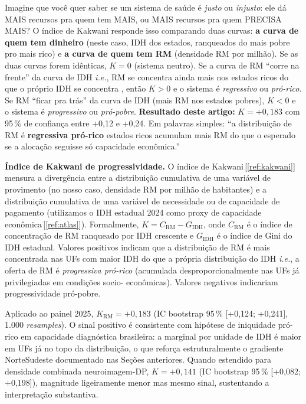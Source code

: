 \documentclass[12pt,a4paper,oneside]{article}
\begin{document}
\begin{tcolorbox}[colback=blue!4,colframe=blue!50!black,
                  sharp corners,boxrule=0.4pt,
                  title=\textbf{Em linguagem simples: o que é o
                  índice de Kakwani?},fonttitle=\small\bfseries]
\small
Imagine que você quer saber se um sistema de saúde é \textit{justo}
ou \textit{injusto}: ele dá MAIS recursos pra quem tem MAIS, ou
MAIS recursos pra quem PRECISA MAIS? O índice de Kakwani responde
isso comparando duas curvas: \textbf{a curva de quem tem dinheiro}
(neste caso, IDH dos estados, ranqueados do mais pobre pro mais
rico) e \textbf{a curva de quem tem RM} (densidade RM por milhão).
Se as duas curvas forem idênticas, $K = 0$ (sistema neutro). Se a
curva de RM ``corre na frente'' da curva de IDH \textemdash{}
\textit{i.e.}, RM se concentra ainda mais nos estados ricos do que
o próprio IDH se concentra \textemdash{}, então $K > 0$ e o sistema
é \textit{regressivo} ou \textit{pró-rico}. Se RM ``ficar pra
trás'' da curva de IDH (mais RM nos estados pobres), $K < 0$ e o
sistema é \textit{progressivo} ou \textit{pró-pobre}.
\textbf{Resultado deste artigo:} $K = +0{,}183$ com 95\,\% de
confiança entre +0,12 e +0,24. Em palavras simples: ``a
distribuição de RM é \textbf{regressiva pró-rico} \textemdash{}
estados ricos acumulam mais RM do que o esperado se a alocação
seguisse só capacidade econômica.''
\end{tcolorbox}

\textbf{Índice de Kakwani de progressividade.} O índice de
Kakwani\,[\ref{ref:kakwani}] mensura a divergência entre a
distribuição cumulativa de uma variável de provimento (no nosso
caso, densidade RM por milhão de habitantes) e a distribuição
cumulativa de uma variável de necessidade ou de capacidade de
pagamento (utilizamos o IDH estadual 2024 como proxy de capacidade
econômica\,[\ref{ref:atlas}]). Formalmente, $K = C_{\text{RM}} -
G_{\text{IDH}}$, onde $C_{\text{RM}}$ é o índice de concentração
de RM ranqueado por IDH crescente e $G_{\text{IDH}}$ é o índice
de Gini do IDH estadual. Valores positivos indicam que a
distribuição de RM é mais concentrada nas UFs com maior IDH do
que a própria distribuição do IDH \textemdash{} \textit{i.e.}, a
oferta de RM é \textit{progressiva pró-rico} (acumulada
desproporcionalmente nas UFs já privilegiadas em condições socio-
econômicas). Valores negativos indicariam progressividade pró-pobre.

Aplicado ao painel 2025, $K_{\text{RM}} = +0{,}183$ (IC bootstrap
95\,\% [+0{,}124; +0{,}241], 1.000 \textit{resamples}). O sinal
positivo é consistente com hipótese de iniquidade pró-rico em
capacidade diagnóstica brasileira: a marginal por unidade de IDH
é maior em UFs já no topo da distribuição, o que reforça
estruturalmente o gradiente Norte\textendash Sudeste documentado
nas Seções anteriores. Quando estendido para densidade combinada
neuroimagem-DP, $K = +0{,}141$ (IC bootstrap 95\,\% [+0{,}082;
+0{,}198]), magnitude ligeiramente menor mas mesmo sinal,
sustentando a interpretação substantiva.
\end{document}
